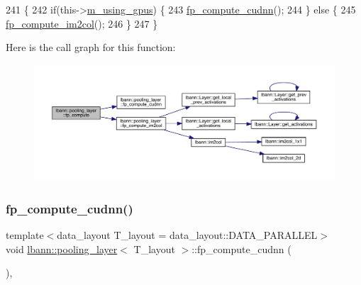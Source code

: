 \begin{DoxyCode}
241                              \{
242     \textcolor{keywordflow}{if}(this->\hyperlink{classlbann_1_1Layer_af7881cb5eff5207c15fa835d65462e8f}{m\_using\_gpus}) \{
243       \hyperlink{classlbann_1_1pooling__layer_a022eb4448992f654288b6b1ca95fcb6c}{fp\_compute\_cudnn}();
244     \} \textcolor{keywordflow}{else} \{
245       \hyperlink{classlbann_1_1pooling__layer_a76ce07a190fbe85685ea2ab4e53be7f9}{fp\_compute\_im2col}();
246     \}
247   \}
\end{DoxyCode}
Here is the call graph for this function\+:\nopagebreak
\begin{figure}[H]
\begin{center}
\leavevmode
\includegraphics[width=350pt]{classlbann_1_1pooling__layer_a0af01b6939abe9798fa3a0b1f5292721_cgraph}
\end{center}
\end{figure}
\mbox{\label{classlbann_1_1pooling__layer_a022eb4448992f654288b6b1ca95fcb6c}} 
\subsubsection{\texorpdfstring{fp\+\_\+compute\+\_\+cudnn()}{fp\_compute\_cudnn()}}
{\footnotesize\ttfamily template$<$data\+\_\+layout T\+\_\+layout = data\+\_\+layout\+::\+D\+A\+T\+A\+\_\+\+P\+A\+R\+A\+L\+L\+EL$>$ \\
void \hyperlink{classlbann_1_1pooling__layer}{lbann\+::pooling\+\_\+layer}$<$ T\+\_\+layout $>$\+::fp\+\_\+compute\+\_\+cudnn (\begin{DoxyParamCaption}{ }\end{DoxyParamCaption})\hspace{0.3cm}{\ttfamily [inline]}, {\ttfamily [private]}}



